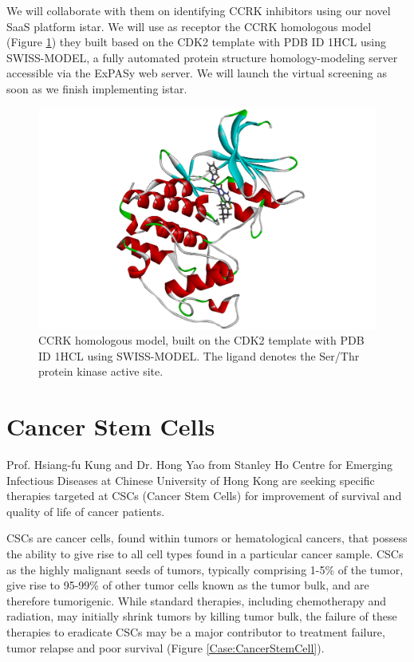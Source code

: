 We will collaborate with them on identifying CCRK inhibitors using our novel SaaS platform istar. We will use as receptor the CCRK homologous model (Figure \ref{Case:CCRKHomologousModel}) they built based on the CDK2 template with PDB ID 1HCL \citep{1142} using SWISS-MODEL, a fully automated protein structure homology-modeling server accessible via the ExPASy web server. We will launch the virtual screening as soon as we finish implementing istar.

\begin{figure}
\centering
\includegraphics[width=\linewidth]{Case/CCRKHomologousModel.png}
\caption{CCRK homologous model, built on the CDK2 template with PDB ID 1HCL \citep{1142} using SWISS-MODEL. The ligand denotes the Ser/Thr protein kinase active site.}
\label{Case:CCRKHomologousModel}
\end{figure}

\section{Cancer Stem Cells}

Prof. Hsiang-fu Kung and Dr. Hong Yao from Stanley Ho Centre for Emerging Infectious Diseases at Chinese University of Hong Kong are seeking specific therapies targeted at CSCs (Cancer Stem Cells) for improvement of survival and quality of life of cancer patients.

CSCs are cancer cells, found within tumors or hematological cancers, that possess the ability to give rise to all cell types found in a particular cancer sample. CSCs as the highly malignant seeds of tumors, typically comprising 1-5\% of the tumor, give rise to 95-99\% of other tumor cells known as the tumor bulk, and are therefore tumorigenic. While standard therapies, including chemotherapy and radiation, may initially shrink tumors by killing tumor bulk, the failure of these therapies to eradicate CSCs may be a major contributor to treatment failure, tumor relapse and poor survival (Figure \ref{Case:CancerStemCell}).

